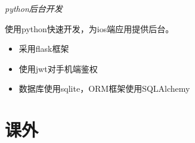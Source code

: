 \documentclass{uniquecv}
\begin{document}
\textit{python后台开发}

使用python快速开发，为ios端应用提供后台。
\vspace{0.4ex}
\begin{itemize}
		\item 采用flask框架
		\item 使用jwt对手机端鉴权
		\item 数据库使用sqlite，ORM框架使用SQLAlchemy
\end{itemize}






\section{课外}
\end{document}

